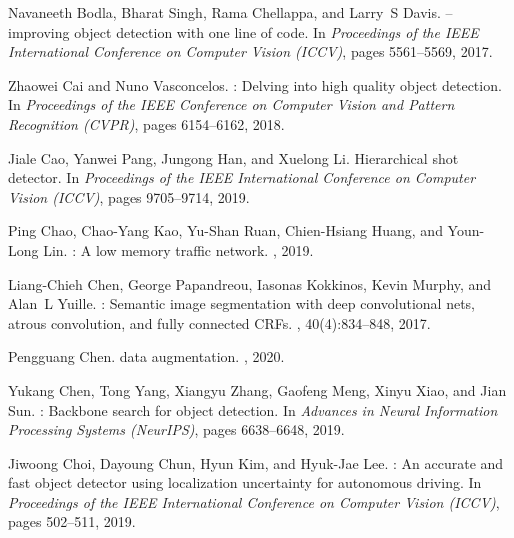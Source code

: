 \documentclass[10pt,twocolumn,letterpaper]{article}
\begin{document}
\clearpage
\clearpage
\clearpage
{\small

\begin{thebibliography}{100}\itemsep=-1pt
	
	Navaneeth Bodla, Bharat Singh, Rama Chellappa, and Larry~S Davis.
	--improving object detection with one line of code.
	\newblock In {\em Proceedings of the IEEE International Conference on Computer
		Vision (ICCV)}, pages 5561--5569, 2017.
	
	Zhaowei Cai and Nuno Vasconcelos.
	: Delving into high quality object detection.
	\newblock In {\em Proceedings of the IEEE Conference on Computer Vision and
		Pattern Recognition (CVPR)}, pages 6154--6162, 2018.
	
	Jiale Cao, Yanwei Pang, Jungong Han, and Xuelong Li.
	\newblock Hierarchical shot detector.
	\newblock In {\em Proceedings of the IEEE International Conference on Computer
		Vision (ICCV)}, pages 9705--9714, 2019.
	
	Ping Chao, Chao-Yang Kao, Yu-Shan Ruan, Chien-Hsiang Huang, and Youn-Long Lin.
	: A low memory traffic network.
	, 2019.
	
	Liang-Chieh Chen, George Papandreou, Iasonas Kokkinos, Kevin Murphy, and Alan~L
	Yuille.
	: Semantic image segmentation with deep convolutional nets,
	atrous convolution, and fully connected {CRFs}.
	, 40(4):834--848, 2017.
	
	Pengguang Chen.
	 data augmentation.
	, 2020.
	
	Yukang Chen, Tong Yang, Xiangyu Zhang, Gaofeng Meng, Xinyu Xiao, and Jian Sun.
	: Backbone search for object detection.
	\newblock In {\em Advances in Neural Information Processing Systems (NeurIPS)},
	pages 6638--6648, 2019.
	
	Jiwoong Choi, Dayoung Chun, Hyun Kim, and Hyuk-Jae Lee.
	: An accurate and fast object detector using
	localization uncertainty for autonomous driving.
	\newblock In {\em Proceedings of the IEEE International Conference on Computer
		Vision (ICCV)}, pages 502--511, 2019.
	

\end{thebibliography}}
\end{document}
